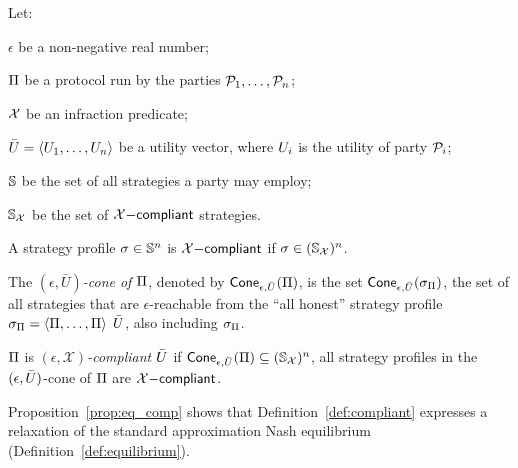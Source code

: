 \begin{definition}\label{def:compliant}
    Let:
    \begin{inparaenum}[i)]
        \item $\epsilon$ be a non-negative real number;
        \item $\Pi$ be a protocol run by the parties $\mathcal{P}_1, \ldots, \mathcal{P}_n$;
        \item $\mathcal{X}$ be an infraction predicate;
        \item $\bar{U}=\langle U_1, \ldots, U_n \rangle$ be a utility vector, where $U_i$ is the utility of party $\mathcal{P}_i$;
        \item $\mathbb{S}$ be the set of all strategies a party may employ;
        \item $\mathbb{S}_{\mathcal{X}}$ be the set of $\mathcal{X}\mathsf{-compliant}$ strategies.
    \end{inparaenum}

    A strategy profile $\sigma \in \mathbb{S}^n$ is $\mathcal{X}\mathsf{-compliant}$ if $\sigma \in (\mathbb{S}_{\mathcal{X}})^n$.

    The \emph{$(\epsilon,\bar{U})$-cone of $\Pi$}, denoted by $\mathsf{Cone}_{\epsilon,\bar{U}}(\Pi)$, is the set $\mathsf{Cone}_{\epsilon, \bar{U}}(\sigma_\Pi)$, \ie the set of all strategies that are $\epsilon$-reachable from the ``all honest'' strategy profile $\sigma_\Pi = \langle \Pi, \ldots, \Pi \rangle$ \wrt $\bar{U}$, also including $\sigma_\Pi$.

    $\Pi$ is \emph{$(\epsilon,\mathcal{X})$-compliant \wrt $\bar{U}$} if $\mathsf{Cone}_{\epsilon,\bar{U}}(\Pi) \subseteq (\mathbb{S}_{\mathcal{X}})^n$, \ie all strategy profiles in the $(\epsilon,\bar{U})$-cone of $\Pi$ are $\mathcal{X}\mathsf{-compliant}$.
\end{definition}

Proposition~\ref{prop:eq_comp} shows that Definition~\ref{def:compliant} expresses a relaxation of the standard approximation Nash equilibrium (Definition~\ref{def:equilibrium}).

